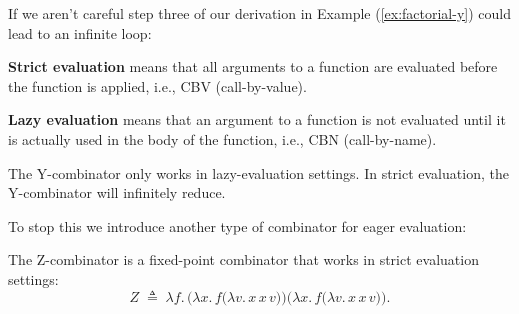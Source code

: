 \noindent
If we aren't careful step three of our derivation in Example (\ref{ex:factorial-y}) could lead to an infinite loop:

\begin{Def}

    \label{def:strict-vs-lazy}
    \noindent
    \textbf{Strict evaluation} means that all arguments to a function are evaluated before the function is applied, i.e., CBV (call-by-value).

    \noindent
    \textbf{Lazy evaluation} means that an argument to a function is not evaluated until it is actually used in the body of the function, i.e., CBN (call-by-name).
\end{Def}

\begin{theo}

    \label{theo:y-combinator-lazy}
    \noindent
    The Y-combinator only works in lazy-evaluation settings. In strict evaluation, the Y-combinator will infinitely reduce.
\end{theo}

\noindent
To stop this we introduce another type of combinator for eager evaluation:
\begin{Def}[Z-Combinator]
    
        \label{def:z-combinator}
        \noindent
        The Z-combinator is a fixed-point combinator that works in strict evaluation settings:
        \LARGE
        \[
        Z \;\triangleq\; 
        \lambda f.\,\bigl(\lambda x.\,f\bigl(\lambda v.\,x\,x\,v\bigr)\bigr)
                    \bigl(\lambda x.\,f\bigl(\lambda v.\,x\,x\,v\bigr)\bigr).
        \]
        \normalsize
\end{Def}

